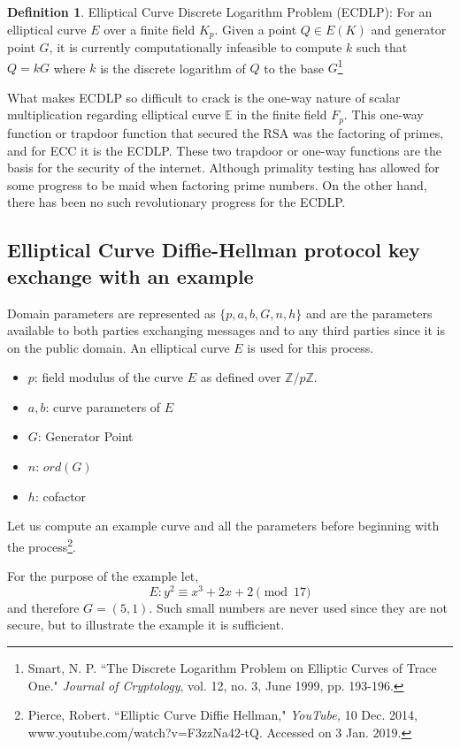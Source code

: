 \documentclass[a4paper,12pt]{article}
\theoremstyle{definition}
\newtheorem{definition}{Definition}
\begin{document}
\begin{definition}{Elliptical Curve Discrete Logarithm Problem (ECDLP):} 
	For an elliptical curve $E$ over a finite field $K_p$. Given a point  $Q \in E(K)$ and generator point $G$, it is currently computationally infeasible to compute $k$ such that $Q=kG$ where $k$ is the discrete logarithm of $Q$ to the base $G$\footnote{Smart, N. P. ``The Discrete Logarithm Problem on Elliptic Curves of Trace One." \textit{Journal of Cryptology}, vol. 12, no. 3, June 1999, pp. 193-196.}
\end{definition}
What makes ECDLP so difficult to crack is the one-way nature of scalar multiplication regarding elliptical curve $\mathbb{E}$ in the finite field $F_p$. This one-way function or trapdoor function that secured the RSA was the factoring of primes, and for ECC it is the ECDLP. These two trapdoor or one-way functions are the basis for the security of the internet. Although primality testing has allowed for some progress to be maid when factoring prime numbers. On the other hand, there has been no such revolutionary progress for the ECDLP.

\subsection{Elliptical Curve Diffie-Hellman protocol key exchange with an example}
Domain parameters are represented as $\{p,a,b,G,n,h\}$ and are the parameters available to both parties exchanging messages and to any third parties since it is on the public domain. An elliptical curve $E$ is used for this process.
\begin{itemize}
	\item $p$: field modulus of the curve $E$ as defined over $\mathbb{Z}/p\mathbb{Z}$.
	\item $a,b$: curve parameters of $E$
	\item $G$: Generator Point
	\item $n$: $ord(G)$
	\item $h$: cofactor
\end{itemize}

Let us compute an example curve and all the parameters before beginning with the process\footnote{Pierce, Robert. ``Elliptic Curve Diffie Hellman," \textit{YouTube,} 10 Dec. 2014, www.youtube.com/watch?v=F3zzNa42-tQ. Accessed on 3 Jan. 2019.}.

	For the purpose of the example let,
	\begin{equation} \label{sampleellipticalcurve}
		E: y^2 \equiv x^3 +2x+2 \pmod{17}
	\end{equation} and therefore $G=(5,1)$. Such small numbers are never used since they are not secure, but to illustrate the example it  is sufficient.
	
\end{document}
